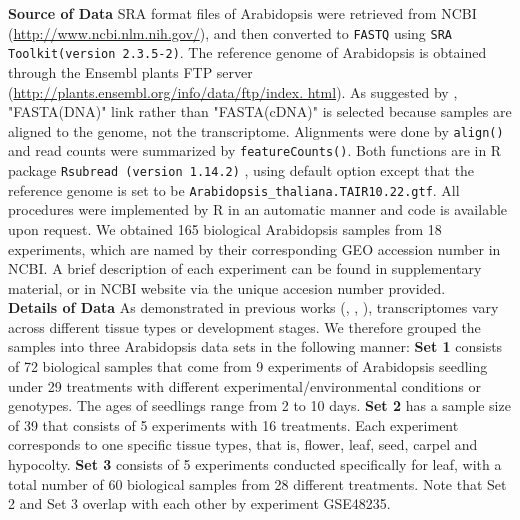 \documentclass[11pt, a4paper]{article}
\begin{document}
\textbf{Source of Data} SRA format files of Arabidopsis were retrieved from NCBI  (\url{http://www.ncbi.nlm.nih.gov/}), and then converted to \verb"FASTQ" using \verb"SRA Toolkit(version 2.3.5-2)". The reference genome of Arabidopsis is obtained  through the Ensembl plants FTP server (\url{http://plants.ensembl.org/info/data/ftp/index. html}). As suggested by \cite{anders2013count},  "FASTA(DNA)" link rather than "FASTA(cDNA)" is selected because samples are aligned to the genome, not the transcriptome. Alignments were done by  \verb"align()" and read counts were summarized by \verb"featureCounts()". Both functions are in R package \verb"Rsubread (version 1.14.2)"  \citep{shi2013subread},\nocite{liao2013subread} using default option except that the reference genome is set to be \verb"Arabidopsis_thaliana.TAIR10.22.gtf". All procedures were implemented by R in an automatic manner and code is available upon request.  We obtained 165 biological Arabidopsis samples from 18 experiments, which are named by their corresponding GEO accession number in NCBI.  A brief description of each experiment can be found in supplementary material, or in NCBI website via the unique accesion number provided.\\

\textbf{Details of Data} As demonstrated in previous works (\cite{czechowski2005genome}, \cite{hruz2011refgenes}, \cite{dekkers2012identification}), transcriptomes vary across different tissue types or development stages. We therefore grouped the samples into three Arabidopsis data sets in the following manner: \textbf{Set 1} consists of 72 biological samples that come from 9 experiments of Arabidopsis seedling under 29 treatments with different experimental/environmental conditions or genotypes. The ages of seedlings range from 2 to 10 days. \textbf{Set 2} has a sample size of 39 that consists of 5 experiments with 16 treatments. Each experiment corresponds to one specific tissue types, that is, flower, leaf, seed, carpel and hypocolty. \textbf{Set 3} consists of 5 experiments conducted specifically for leaf, with a total number of 60 biological samples from 28 different treatments. Note that  Set 2 and Set 3 overlap with each other by experiment GSE48235.  \\
\end{document}
